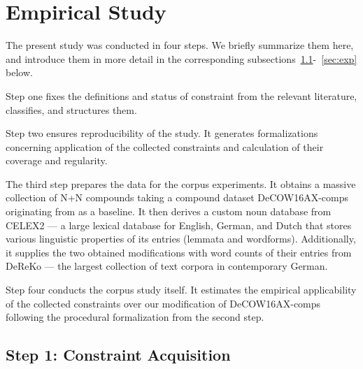 \documentclass[10pt, a4paper]{article}
\begin{document}

\section{Empirical Study}
\label{sec:corp}

The present study was conducted in four steps. We briefly summarize them here, and introduce them in more detail in the corresponding subsections~\ref{sec:constrget}-~\ref{sec:exp} below.

Step one fixes the definitions and status of constraint from the relevant literature, classifies, and structures them.

Step two ensures reproducibility of the study. It generates formalizations concerning application of the collected constraints and calculation of their coverage and regularity.     

The third step prepares the data for the corpus experiments. It obtains a massive collection of N+N compounds taking a compound dataset DeCOW16AX-comps originating from  as a baseline. It then derives a custom noun database from CELEX2  --- a large lexical database for English, German, and Dutch that stores various linguistic properties of its entries (lemmata and wordforms). Additionally, it supplies the two obtained modifications with word counts of their entries from DeReKo  --- the largest collection of text corpora in contemporary German.

Step four conducts the corpus study itself. It estimates the empirical applicability of the collected constraints over our modification of DeCOW16AX-comps following the procedural formalization from the second step.




\subsection{Step 1: Constraint Acquisition}
\label{sec:constrget}
\end{document}
